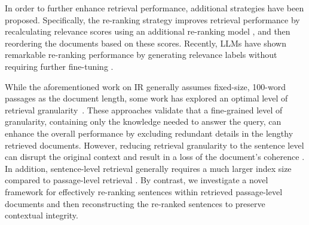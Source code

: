 In order to further enhance retrieval performance, additional strategies have been proposed.
Specifically, the re-ranking strategy improves retrieval performance by recalculating relevance scores using an additional re-ranking model \cite{bert-rerank, monot5, rankt5}, and then reordering the documents based on these scores.
Recently, LLMs have shown remarkable re-ranking performance by generating relevance labels without requiring further fine-tuning \cite{holistic, prp}.


While the aforementioned work on IR \cite{100words, DPR-karpukhin} generally assumes fixed-size, 100-word passages as the document length, some work has explored an optimal level of retrieval granularity~\cite{phrase, phrase_retriever,proconvqa,denseXretrieval}.
These approaches validate that a fine-grained level of granularity, containing only the knowledge needed to answer the query, can enhance the overall performance by excluding redundant details in the lengthy retrieved documents. 
However, reducing retrieval granularity to the sentence level can disrupt the original context and result in a loss of the document’s coherence \cite{decontextualization}.
In addition, sentence-level retrieval generally requires a much larger index size compared to passage-level retrieval \cite{DBLP:conf/emnlp/LeeWC21}.
By contrast, we investigate a novel framework for effectively re-ranking sentences within retrieved passage-level documents and then reconstructing the re-ranked sentences to preserve contextual integrity.


